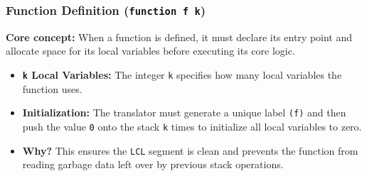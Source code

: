 \documentclass[12pt,a4paper]{article}
\begin{document}
\subsubsection*{Function Definition (\texttt{function f k})}
\textbf{Core concept:} When a function is defined, it must declare its entry point and allocate space for its local variables before executing its core logic.
\begin{itemize}
    \item \textbf{\texttt{k} Local Variables:} The integer \texttt{k} specifies how many local variables the function uses.
    \item \textbf{Initialization:} The translator must generate a unique label \texttt{(f)} and then push the value \texttt{0} onto the stack \texttt{k} times to initialize all local variables to zero.
    \item \textbf{Why?} This ensures the \texttt{LCL} segment is clean and prevents the function from reading garbage data left over by previous stack operations.
\end{itemize}
\end{document}
